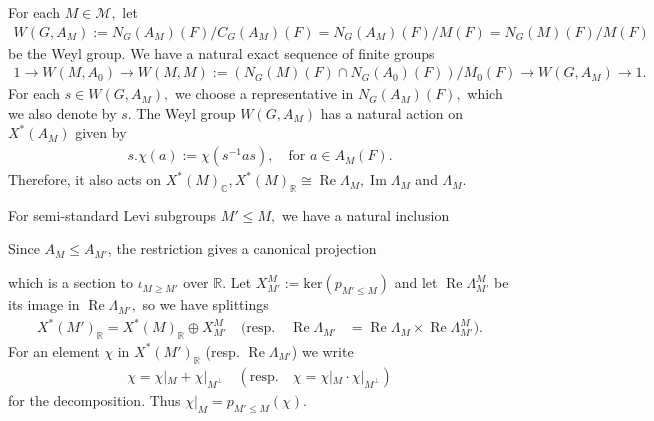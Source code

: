 \documentclass[10pt]{amsart}
\theoremstyle{definition}
\numberwithin{equation}{section}
\numberwithin{equation}{subsection}
\newcommand{\RR}{\mathbb{R}}
\newcommand{\CC}{\mathbb{C}}
\renewcommand{\Im}{\mathop{\mathrm{Im}}}
\renewcommand{\Re}{\mathop{\mathrm{Re}}}
\begin{document}
For each $M\in \mathcal{M},$ let
\begin{align*}
    W(G,A_M):=N_G(A_M)(F)/C_G(A_M)(F)=N_G(A_M)(F)/M(F)=N_G(M)(F)/M(F)
\end{align*}
be the Weyl group. We have a natural exact sequence of finite groups
\begin{align*}
    1\longrightarrow W(M,A_0)\longrightarrow W(M,M):=(N_G(M)(F)\cap N_G(A_0)(F))/M_0(F)\longrightarrow W(G,A_M)\longrightarrow 1.
\end{align*}
For each $s\in W(G,A_M),$ we choose a representative in $N_G(A_M)(F),$ which we also denote by $s$. The Weyl group $W(G,A_M)$ has a natural action on $X^\ast(A_M)$ given by 
\begin{align*}
    s.\chi(a):=\chi(s^{-1}as), \quad \textrm{for } a\in A_M(F).
\end{align*}
Therefore, it also acts on $X^\ast(M)_\CC, X^\ast(M)_\RR\cong \Re\Lambda_M, \Im\Lambda_M$ and $\Lambda_M$. 

For semi-standard Levi subgroups $M'\leq M,$ we have a natural inclusion
\begin{center}
\end{center}
Since $A_M\le A_{M'}$, the restriction gives a canonical projection
\begin{center}
\end{center}
which is a section to $\iota_{M\ge M'}$ over $\RR$. Let $X_{M'}^{M} := \mathrm{ker}(p_{M'\leq M})$ and let $\Re\Lambda_{M'}^{M}$ be its image in $\Re \Lambda_{M'},$ so we have splittings
\begin{align*}
    X^\ast(M')_\RR=X^\ast(M)_\RR\oplus X_{M'}^{M} \quad (\textrm{resp.}\quad \Re\Lambda_{M'} &= \Re\Lambda_M \times \Re\Lambda_{M'}^{M}).
\end{align*}
For an element $\chi$ in $X^\ast(M')_\RR$ (resp. $\Re\Lambda_{M'}$) we write
\begin{align*}
    \chi=\chi|_M+ \chi|_{M^\perp} \quad (\textrm{resp}.\quad \chi=\chi|_M\cdot \chi|_{M^\perp})
\end{align*}
for the decomposition. Thus $\chi|_M=p_{M'\le M}(\chi).$
\end{document}
